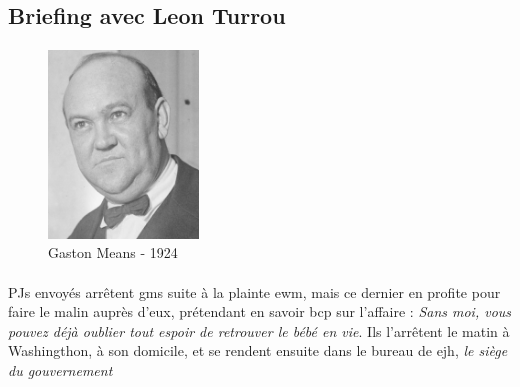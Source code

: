 \subsection{Briefing avec Leon Turrou}

\paragraph{}

\begin{figure}
\begin{center}
 \includegraphics[width=40mm]{../pnjs/gaston-means-1924.png}
\end{center}
\caption{Gaston Means - 1924}
\end{figure}

\paragraph{} PJs envoyés arrêtent \gls{gms} suite à la plainte \gls{ewm}, mais ce dernier en profite pour faire le malin 
auprès d'eux, prétendant en savoir bcp sur l'affaire : \emph{Sans moi, vous pouvez déjà oublier tout espoir de retrouver le 
bébé en vie}. Ils l'arrêtent le matin à Washingthon, à son domicile, et se rendent ensuite dans le bureau de \gls{ejh}, 
\emph{le siège du gouvernement} 




